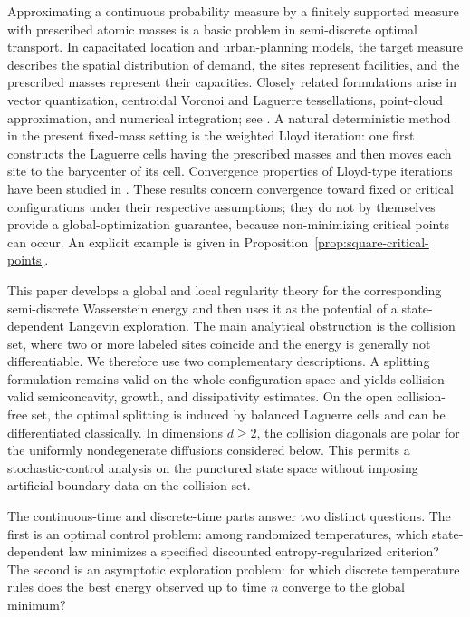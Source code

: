 \documentclass[11pt]{article}
\theoremstyle{definition}
\theoremstyle{remark}
\numberwithin{equation}{section}
\begin{document}
Approximating a continuous probability measure by a finitely supported measure with prescribed
atomic masses is a basic problem in semi-discrete optimal transport.  In capacitated location and
urban-planning models, the target measure describes the spatial distribution of demand, the sites
represent facilities, and the prescribed masses represent their capacities.  Closely related
formulations arise in vector quantization, centroidal Voronoi and Laguerre tessellations, point-cloud
approximation, and numerical integration; see
\cite{ButtazzoSantambrogio2009,DuFaberGunzburger1999,GrafLuschgy2000,
BourneRoper2015,MerigotSantambrogioSarrazin2021}.  A natural deterministic method in the present
fixed-mass setting is the weighted Lloyd iteration: one first constructs the Laguerre cells having the
prescribed masses and then moves each site to the barycenter of its cell.  Convergence properties of
Lloyd-type iterations have been studied in
\cite{DuEmelianenkoJu2006,EmelianenkoJuRand2008,BourneRoper2015,
PortalesCazellesPauwels2025}.  These results concern convergence toward fixed or critical
configurations under their respective assumptions; they do not by themselves provide a
global-optimization guarantee, because non-minimizing critical points can occur.  An explicit example
is given in Proposition~\ref{prop:square-critical-points}.

This paper develops a global and local regularity theory for the corresponding semi-discrete
Wasserstein energy and then uses it as the potential of a state-dependent Langevin exploration.  The
main analytical obstruction is the collision set, where two or more labeled sites coincide and the
energy is generally not differentiable.  We therefore use two complementary descriptions.  A
splitting formulation remains valid on the whole configuration space and yields collision-valid
semiconcavity, growth, and dissipativity estimates.  On the open collision-free set, the optimal
splitting is induced by balanced Laguerre cells and can be differentiated classically.  In dimensions
$d\ge2$, the collision diagonals are polar for the uniformly nondegenerate diffusions considered
below.  This permits a stochastic-control analysis on the punctured state space without imposing
artificial boundary data on the collision set.

The continuous-time and discrete-time parts answer two distinct questions.  The first is an optimal
control problem: among randomized temperatures, which state-dependent law minimizes a specified
discounted entropy-regularized criterion?  The second is an asymptotic exploration problem: for
which discrete temperature rules does the best energy observed up to time $n$ converge to the
global minimum?
\end{document}
